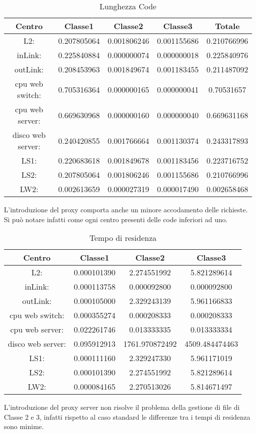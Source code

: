 \begin{table}[htbp]
\begin{center}
\begin{tabular}{|c|c|c|c|c|}
\hline
Centro &Classe1 &Classe2 &Classe3 &Totale\\
\hline
\hline
L2: &0.207805064 &0.001806246 &0.001155686 &0.210766996\\
\hline
inLink: &0.225840884 &0.000000074 &0.000000018 &0.225840976\\
\hline
outLink: &0.208453963 &0.001849674 &0.001183455 &0.211487092\\
\hline
cpu web switch: &0.705316364 &0.000000165 &0.000000041 &0.70531657\\
\hline
cpu web server: &0.669630968 &0.000000160 &0.000000040 &0.669631168\\
\hline
disco web server: &0.240420855 &0.001766664 &0.001130374 &0.243317893\\
\hline
LS1: &0.220683618 &0.001849678 &0.001183456 &0.223716752\\
\hline
LS2: &0.207805064 &0.001806246 &0.001155686 &0.210766996\\
\hline
LW2: &0.002613659 &0.000027319 &0.000017490 &0.002658468\\
\hline
\end{tabular}
\end{center}
\caption{Lunghezza Code}
\label{lunghezzacode}
\end{table}
L'introduzione del proxy comporta anche un minore accodamento delle richieste. Si può notare infatti come ogni centro presenti delle code inferiori ad uno.
\begin{table}[htbp]
\begin{center}
\begin{tabular}{|c|c|c|c|}
\hline
Centro &Classe1 &Classe2 &Classe3\\
\hline
\hline
L2: &0.000101390 &2.274551992 &5.821289614\\
\hline
inLink: &0.000113758 &0.000092800 &0.000092800\\
\hline
outLink: &0.000105000 &2.329243139 &5.961166833\\
\hline
cpu web switch: &0.000355274 &0.000208333 &0.000208333\\
\hline
cpu web server: &0.022261746 &0.013333335 &0.013333334\\
\hline
disco web server: &0.095912913 &1761.970872492 &4509.484474463\\
\hline
LS1: &0.000111160 &2.329247330 &5.961171019\\
\hline
LS2: &0.000101390 &2.274551992 &5.821289614\\
\hline
LW2: &0.000084165 &2.270513026 &5.814671497\\
\hline
\end{tabular}
\end{center}
\caption{Tempo di residenza}
\label{tempodiresidenza}
\end{table}
L'introduzione del proxy server non risolve il problema della gestione di file di Classe 2 e 3, infatti rispetto al caso standard le differenze tra i tempi di residenza sono minime.
